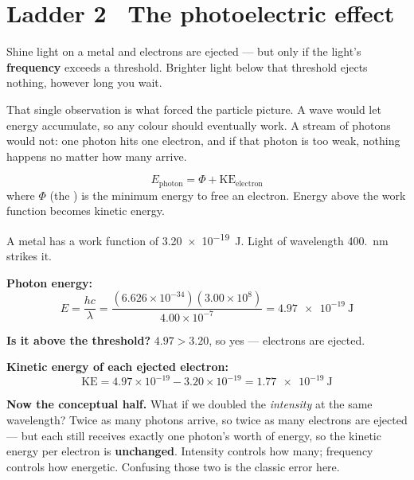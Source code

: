 \documentclass{apchem-worksheet}
\begin{document}
\section*{\sffamily Ladder 2 \textbullet\ The photoelectric effect}

Shine light on a metal and electrons are ejected --- but only if the
light's \textbf{frequency} exceeds a threshold. Brighter light below that
threshold ejects nothing, however long you wait.

That single observation is what forced the particle picture. A wave would
let energy accumulate, so any colour should eventually work. A stream of
photons would not: one photon hits one electron, and if that photon is
too weak, nothing happens no matter how many arrive.

\[ E_{\text{photon}} = \Phi + \mathrm{KE}_{\text{electron}} \]
where $\Phi$ (the ) is the minimum energy to free an
electron. Energy above the work function becomes kinetic energy.

\begin{workedexample}
A metal has a work function of \SI{3.20e-19}{\joule}. Light of
wavelength \SI{400.}{\nano\meter} strikes it.

\textbf{Photon energy:}
\[ E = \frac{hc}{\lambda}
   = \frac{(6.626\times10^{-34})(3.00\times10^{8})}{4.00\times10^{-7}}
   = \SI{4.97e-19}{\joule} \]

\textbf{Is it above the threshold?} $4.97 > 3.20$, so yes --- electrons
are ejected.

\textbf{Kinetic energy of each ejected electron:}
\[ \mathrm{KE} = 4.97\times10^{-19} - 3.20\times10^{-19}
   = \SI{1.77e-19}{\joule} \]

\textbf{Now the conceptual half.} What if we doubled the
\emph{intensity} at the same wavelength? Twice as many photons arrive, so
twice as many electrons are ejected --- but each still receives exactly
one photon's worth of energy, so the kinetic energy per electron is
\textbf{unchanged}. Intensity controls how many; frequency controls how
energetic. Confusing those two is the classic error here.
\end{workedexample}
\end{document}
